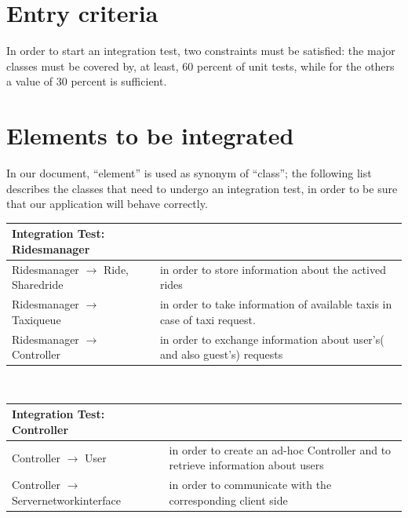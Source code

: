 \section{Entry criteria}
In order to start an integration test, two constraints must be satisfied:
the major classes must be covered by, at least, 60 percent of unit tests, 
while for the others a value of 30 percent is sufficient.

\section{Elements to be integrated}
In our document, ``element'' is used as synonym of ``class'';
the following list describes the classes that need to undergo an integration test, 
in order to be sure that our application will behave correctly.

\vspace{5mm}
\begin{tabular*}{1.21\textwidth}{ l p{7cm}}
 \textbf{Integration Test}: Ridesmanager	&  \\
 \hline
  Ridesmanager $\rightarrow$ Ride, Sharedride & in order to store information about the actived rides \\  
 \hline
 Ridesmanager $\rightarrow$ Taxiqueue & in order to take information of available taxis  in case of taxi request. \\
 \hline
 Ridesmanager $\rightarrow$ Controller & in order to exchange information about user's( and also guest's) requests\\
 \hline
 \end{tabular*}\\

\vspace{5mm}
\begin{tabular*}{1.21\textwidth}{ l p{7cm}}
\textbf{Integration Test}: Controller		&  \\
\hline
 Controller $\rightarrow$ User &  in order to create an ad-hoc Controller and to retrieve information about users \\  
 \hline
 Controller $\rightarrow$ Servernetworkinterface &  in order to communicate with the corresponding client side\\
 \hline
 \end{tabular*}\\

